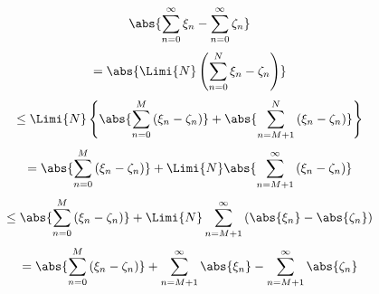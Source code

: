 \begin{Bem}
  \[\abs{\sum^\infty_{n=0}\xi_n-\sum^\infty_{n=0}\zeta_n}\]
  \[=\abs{\Limi{N}\left( \sum^N_{n=0}\xi_n-\zeta_n \right)}\]
  \[\leq \Limi{N}\left\{ \abs{\sum^M_{n=0}\left( \xi_n-\zeta_n \right) }+\abs{\sum^N_{n=M+1}\left( \xi_n-\zeta_n \right)}\right\}\]
  \[=\abs{\sum_{n=0}^M\left( \xi_n-\zeta_n \right)}+\Limi{N}\abs{\sum_{n=M+1}^\infty\left( \xi_n-\zeta_n \right)}\]
  \[\leq\abs{\sum_{n=0}^M\left( \xi_n-\zeta_n \right)}+\Limi{N}\sum_{n=M+1}^\infty\left( \abs{\xi_n}-\abs{\zeta_n} \right)\]
  \[=\abs{\sum_{n=0}^M\left( \xi_n-\zeta_n \right)}+\sum_{n=M+1}^\infty\abs{\xi_n}-\sum_{n=M+1}^\infty\abs{\zeta_n}\]
\end{Bem}
